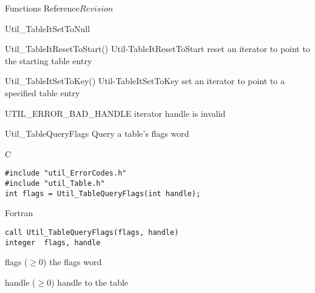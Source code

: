 \begin{cactuspart}{ Functions Reference}{}{$Revision$}
\begin{FunctionDescription}{Util\_TableItSetToNull}
\begin{SeeAlsoSection}
\begin{SeeAlso2} {Util\_TableItResetToStart()} {Util-TableItResetToStart}
reset an iterator to point to the starting table entry
\end{SeeAlso2}
\begin{SeeAlso2} {Util\_TableItSetToKey()} {Util-TableItSetToKey}
set an iterator to point to a specified table entry
\end{SeeAlso2}
\end{SeeAlsoSection}

\begin{ErrorSection}
\begin{Error}{UTIL\_ERROR\_BAD\_HANDLE}
iterator handle is invalid
\end{Error}
\end{ErrorSection}
\end{FunctionDescription}



\begin{FunctionDescription}{Util\_TableQueryFlags}
Query a table's flags word
\label{Util-TableQueryFlags}

\begin{SynopsisSection}
\begin{Synopsis}{C}
\begin{verbatim}
#include "util_ErrorCodes.h"
#include "util_Table.h"
int flags = Util_TableQueryFlags(int handle);
\end{verbatim}
\end{Synopsis}
\begin{Synopsis}{Fortran}
\begin{verbatim}
call Util_TableQueryFlags(flags, handle)
integer  flags, handle
\end{verbatim}
\end{Synopsis}
\end{SynopsisSection}

\begin{ResultSection}
\begin{Result}{flags ($\ge 0$)}
the flags word
\end{Result}
\end{ResultSection}

\begin{ParameterSection}
\begin{Parameter}{handle ($\ge 0$)}
handle to the table
\end{Parameter}
\end{ParameterSection}


\end{FunctionDescription}
\end{cactuspart}
